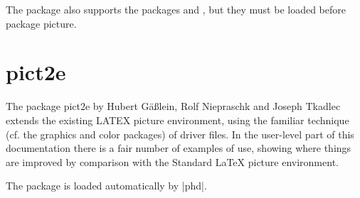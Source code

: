 The package also supports the packages  and , but they must be loaded before package picture.

\section{pict2e}

The package pict2e by Hubert G\"a\ss lein, Rolf Niepraschk and Joseph Tkadlec extends the existing LATEX picture environment, using the familiar
technique (cf. the graphics and color packages) of driver files. In the user-level part of
this documentation there is a fair number of examples of use, showing where things are
improved by comparison with the Standard LaTeX picture environment.

The package is loaded automatically by |phd|.






